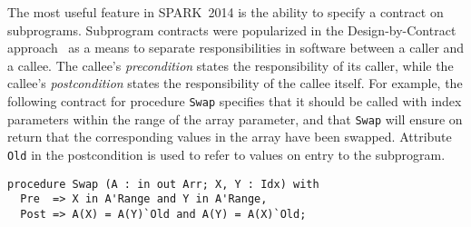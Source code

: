 \documentclass[10pt,a4paper,twocolumn]{article}
\newcommand{\newspark}{SPARK~2014\xspace}
\newcommand{\SPARK}[1]{\lstinline[language=Ada,basicstyle={\footnotesize
      \sffamily},framesep=0pt]$#1$}
\begin{document}
The most useful feature in \newspark is the ability to specify a contract on
subprograms. Subprogram contracts were popularized in the Design-by-Contract
approach~\cite{meyer:1988:OSC} as a means to separate responsibilities in
software between a caller and a callee. The callee's \textit{precondition}
states the responsibility of its caller, while the callee's
\textit{postcondition} states the responsibility of the callee itself.  For
example, the following contract for procedure \SPARK{Swap} specifies that it
should be called with index parameters within the range of the array parameter,
and that \SPARK{Swap} will ensure on return that the corresponding values in
the array have been swapped. Attribute \SPARK{Old} in the postcondition is used
to refer to values on entry to the subprogram.

\begin{lstlisting}
procedure Swap (A : in out Arr; X, Y : Idx) with
  Pre  => X in A'Range and Y in A'Range,
  Post => A(X) = A(Y)`Old and A(Y) = A(X)`Old;
\end{lstlisting}



\end{document}
